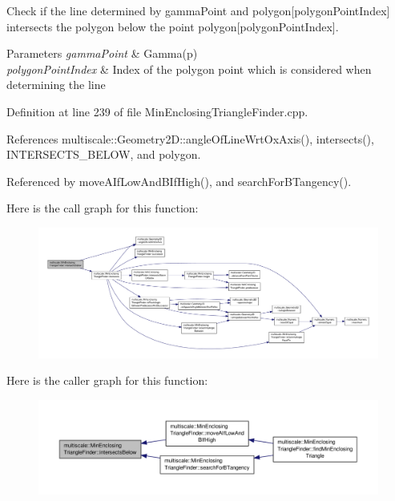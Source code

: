 Check if the line determined by gamma\-Point and polygon\mbox{[}polygon\-Point\-Index\mbox{]} intersects the polygon below the point polygon\mbox{[}polygon\-Point\-Index\mbox{]}. 


\begin{DoxyParams}{Parameters}
{\em gamma\-Point} & Gamma(p) \\
\hline
{\em polygon\-Point\-Index} & Index of the polygon point which is considered when determining the line \\
\hline
\end{DoxyParams}


Definition at line 239 of file Min\-Enclosing\-Triangle\-Finder.\-cpp.



References multiscale\-::\-Geometry2\-D\-::angle\-Of\-Line\-Wrt\-Ox\-Axis(), intersects(), I\-N\-T\-E\-R\-S\-E\-C\-T\-S\-\_\-\-B\-E\-L\-O\-W, and polygon.



Referenced by move\-A\-If\-Low\-And\-B\-If\-High(), and search\-For\-B\-Tangency().



Here is the call graph for this function\-:\nopagebreak
\begin{figure}[H]
\begin{center}
\leavevmode
\includegraphics[width=350pt]{classmultiscale_1_1MinEnclosingTriangleFinder_a0abe1c7d5ef5a43f8ea1b404db0066e0_cgraph}
\end{center}
\end{figure}




Here is the caller graph for this function\-:\nopagebreak
\begin{figure}[H]
\begin{center}
\leavevmode
\includegraphics[width=350pt]{classmultiscale_1_1MinEnclosingTriangleFinder_a0abe1c7d5ef5a43f8ea1b404db0066e0_icgraph}
\end{center}
\end{figure}


